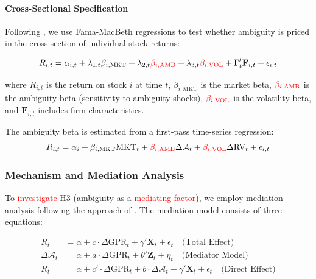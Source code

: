 \documentclass[preprint,12pt,authoryear]{elsarticle}
\begin{document}
\paragraph{Cross-Sectional Specification}
Following \citet{Fama1992Cross}, we use Fama-MacBeth regressions to test whether ambiguity is priced in the cross-section of individual stock returns:

\begin{equation}
R_{i,t} = \alpha_{i,t} + \lambda_{1,t} \beta_{i,\text{MKT}} + \lambda_{2,t} {\color{red}\beta_{i,\text{AMB}}} + \lambda_{3,t} {\color{red}\beta_{i,\text{VOL}}} + \Gamma_{t}' \mathbf{F}_{i,t} + \epsilon_{i,t}
\end{equation}

where $R_{i,t}$ is the return on stock $i$ at time $t$, $\beta_{i,\text{MKT}}$ is the market beta, ${\color{red}\beta_{i,\text{AMB}}}$ is the ambiguity beta (sensitivity to ambiguity shocks), ${\color{red}\beta_{i,\text{VOL}}}$ is the volatility beta, and $\mathbf{F}_{i,t}$ includes firm characteristics.

The ambiguity beta is estimated from a first-pass time-series regression:
\begin{equation}
R_{i,t} = \alpha_i + \beta_{i,\text{MKT}} \text{MKT}_t + {\color{red}\beta_{i,\text{AMB}}} \Delta \mathcal{A}_t + {\color{red}\beta_{i,\text{VOL}}} \Delta \text{RV}_t + \epsilon_{i,t}
\end{equation}

\subsubsection{Mechanism and Mediation Analysis}

To \textcolor{red}{investigate} H3 (ambiguity as a \textcolor{red}{mediating factor}), we employ mediation analysis following the approach of \citet{Baron1986Moderator}. The mediation model consists of three equations:

\begin{align}
R_{t} &= \alpha + c \cdot \Delta \text{GPR}_{t} + \gamma' \mathbf{X}_{t} + \epsilon_{t} \quad \text{(Total Effect)} \\
\Delta \mathcal{A}_{t} &= \alpha + a \cdot \Delta \text{GPR}_{t} + \theta' \mathbf{Z}_{t} + \eta_{t} \quad \text{(Mediator Model)} \\
R_{t} &= \alpha + c' \cdot \Delta \text{GPR}_{t} + b \cdot \Delta \mathcal{A}_{t} + \gamma' \mathbf{X}_{t} + \epsilon_{t} \quad \text{(Direct Effect)}
\end{align}
\end{document}
